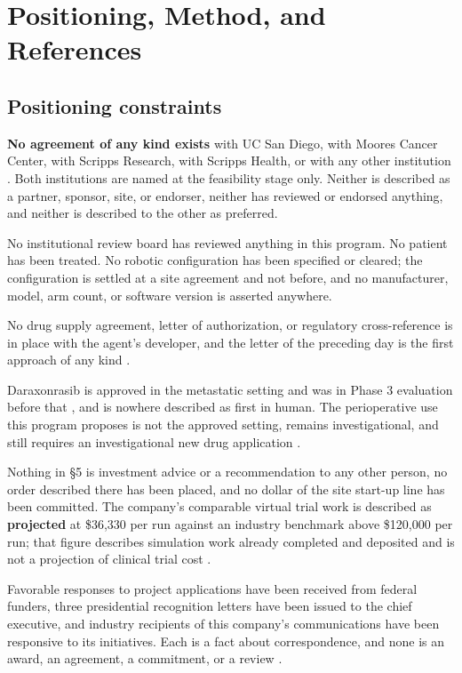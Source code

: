 \section{Positioning, Method, and References}

\subsection{Positioning constraints}

\textbf{No agreement of any kind exists} with UC San Diego, with Moores Cancer
Center, with Scripps Research, with Scripps Health, or with any other institution
\cite{ucsdmoores2026,scrippsdtc2026,ucsdactri2026}. Both institutions are named
at the feasibility stage only. Neither is described as a partner, sponsor, site,
or endorser, neither has reviewed or endorsed anything, and neither is described
to the other as preferred.

No institutional review board has reviewed anything in this program. No patient
has been treated. No robotic configuration has been specified or cleared; the
configuration is settled at a site agreement and not before, and no manufacturer,
model, arm count, or software version is asserted anywhere.

No drug supply agreement, letter of authorization, or regulatory cross-reference
is in place with the agent's developer, and the letter of the preceding day is
the first approach of any kind \cite{revmedexternal2026}.

Daraxonrasib is approved in the metastatic setting and was in Phase 3 evaluation
before that \cite{fdarasonque2026,rasolute302}, and is nowhere described as first
in human. The perioperative use this program proposes is not the approved
setting, remains investigational, and still requires an investigational new drug
application \cite{ecfr2026part312}.

Nothing in \S5 is investment advice or a recommendation to any other person, no
order described there has been placed, and no dollar of the site start-up line
has been committed. The company's comparable virtual trial work is described as
\textbf{projected} at \$36,330 per run against an industry benchmark above
\$120,000 per run; that figure describes simulation work already completed and
deposited and is not a projection of clinical trial cost \cite{capitalplan2026}.

Favorable responses to project applications have been received from federal
funders, three presidential recognition letters have been issued to the chief
executive, and industry recipients of this company's communications have been
responsive to its initiatives. Each is a fact about correspondence, and none is
an award, an agreement, a commitment, or a review \cite{movein2026}.

